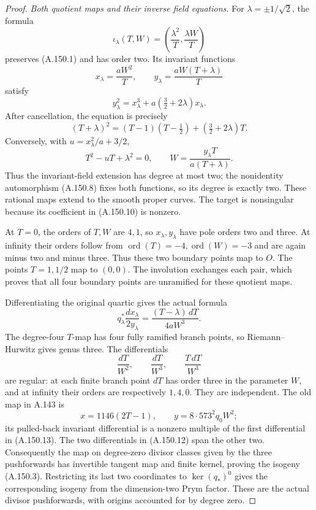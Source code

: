 \begin{proof}
\emph{Both quotient maps and their inverse field equations.}
For \(\lambda=\pm1/\sqrt2\), the formula
\[
       \iota_\lambda(T,W)
          =\left(\frac{\lambda^2}{T},
                         \frac{\lambda W}{T}\right)
\tag{A.150.8}
\]
preserves (A.150.1) and has order two.  Its invariant functions
\[
 x_\lambda=\frac{aW^2}{T},\qquad
 y_\lambda=\frac{aW(T+\lambda)}T
\tag{A.150.9}
\]
satisfy
\[
       y_\lambda^2=x_\lambda^3+
                         a(\tfrac32+2\lambda)x_\lambda .
\tag{A.150.10}
\]
After cancellation, the equation is precisely
\[
 (T+\lambda)^2=(T-1)(T-\tfrac12)
                                      +(\tfrac32+2\lambda)T .
\]
Conversely, with \(u=x_\lambda^2/a+3/2\),
\[
       T^2-uT+\lambda^2=0,\qquad
       W=\frac{y_\lambda T}{a(T+\lambda)}.
\tag{A.150.11}
\]
Thus the invariant-field extension has degree at most two;
the nonidentity automorphism (A.150.8) fixes both functions,
so its degree is exactly two.  These rational maps extend to
the smooth proper curves.  The target is nonsingular because
its coefficient in (A.150.10) is nonzero.

At \(T=0\), the orders of \(T,W\) are \(4,1\), so
\(x_\lambda,y_\lambda\) have pole orders two and three.
At infinity their orders follow from
\(\operatorname{ord}(T)=-4,\operatorname{ord}(W)=-3\)
and are again minus two and minus three.
Thus these two boundary points map to \(O\).
The points \(T=1,1/2\) map to \((0,0)\).
The involution exchanges each pair, which proves that all
four boundary points are unramified for these quotient maps.

Differentiating the original quartic gives the actual formula
\[
       q_\lambda^*\frac{dx_\lambda}{2y_\lambda}
               =\frac{(T-\lambda)\,dT}{4aW^3}.
\tag{A.150.12}
\]
The degree-four \(T\)-map has four fully ramified branch
points, so Riemann--Hurwitz gives genus three.
The differentials
\[
           \frac{dT}{W^2},\qquad
           \frac{dT}{W^3},\qquad
           \frac{T\,dT}{W^3}
\tag{A.150.13}
\]
are regular: at each finite branch point \(dT\) has order
three in the parameter \(W\), and at infinity their orders
are respectively \(1,4,0\).
They are independent.  The old map in A.143 is
\[
       x=1146(2T-1),\qquad y=8\cdot573^2q_0W^2;
\]
its pulled-back invariant differential is a nonzero multiple
of the first differential in (A.150.13).
The two differentials in (A.150.12) span the other two.
Consequently the map on degree-zero divisor classes given by
the three pushforwards has invertible tangent map and finite
kernel, proving the isogeny (A.150.3).
Restricting its last two coordinates to
\(\ker(q_*)^0\) gives the corresponding isogeny from the
dimension-two Prym factor.  These are the actual divisor
pushforwards, with origins accounted for by degree zero.


\end{proof}
